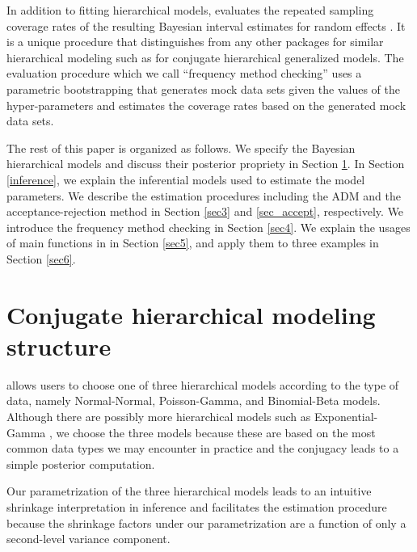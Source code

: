 \documentclass[article]{jss}
\begin{document}
In addition to fitting hierarchical models,  evaluates the repeated sampling coverage rates of the resulting Bayesian interval estimates for random effects \citep{morris1997, daniels1999prior, tang2002fitting, tang2011, morris2012}. It is a unique procedure that distinguishes   from any other  packages for similar hierarchical modeling such as  \citep{hglm2010, ronnegaard2011hglm} for conjugate hierarchical generalized models. The evaluation procedure which we call ``frequency method checking'' uses a parametric bootstrapping  that generates mock data sets given the values of the hyper-parameters and estimates the coverage rates based on the generated mock data sets.

The rest of this paper is organized as follows. We specify the Bayesian hierarchical models and discuss their posterior propriety in Section \ref{sec2}. In Section \ref{inference}, we explain the inferential models used to estimate the model parameters. We describe the estimation procedures including the ADM and the acceptance-rejection method in Section  \ref{sec3} and \ref{sec_accept}, respectively. We introduce the frequency method checking in Section \ref{sec4}.  We explain the usages of main functions in  in Section \ref{sec5}, and apply them to three examples in Section \ref{sec6}.



\section[Hierarchical Structure]{Conjugate hierarchical modeling structure} \label{sec2}


 allows users to choose one of three hierarchical models according to the type of data, namely Normal-Normal, Poisson-Gamma, and Binomial-Beta models. Although there are possibly more hierarchical models such as Exponential-Gamma \citep{tang2002fitting}, we choose the three models because these are based on the most common data types we may encounter in practice and the conjugacy leads to a simple posterior computation.

Our parametrization of the three hierarchical models leads to an intuitive shrinkage interpretation in inference and  facilitates the estimation procedure because the shrinkage factors under our parametrization are a function of only a second-level variance component.
 
\end{document}
